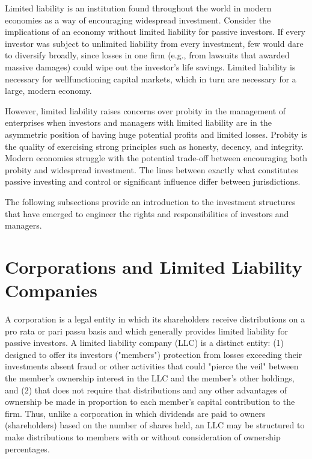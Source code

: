 \documentclass[11pt]{article}
\begin{document}
Limited liability is an institution found throughout the world in modern economies as a way of encouraging widespread investment. Consider the implications of an economy without limited liability for passive investors. If every investor was subject to unlimited liability from every investment, few would dare to diversify broadly, since losses in one firm (e.g., from lawsuits that awarded massive damages) could wipe out the investor's life savings. Limited liability is necessary for wellfunctioning capital markets, which in turn are necessary for a large, modern economy.

However, limited liability raises concerns over probity in the management of enterprises when investors and managers with limited liability are in the asymmetric position of having huge potential profits and limited losses. Probity is the quality of exercising strong principles such as honesty, decency, and integrity. Modern economies struggle with the potential trade-off between encouraging both probity and widespread investment. The lines between exactly what constitutes passive investing and control or significant influence differ between jurisdictions.

The following subsections provide an introduction to the investment structures that have emerged to engineer the rights and responsibilities of investors and managers.

\section*{Corporations and Limited Liability Companies}
A corporation is a legal entity in which its shareholders receive distributions on a pro rata or pari passu basis and which generally provides limited liability for passive investors. A limited liability company (LLC) is a distinct entity: (1) designed to offer its investors ("members") protection from losses exceeding their investments absent fraud or other activities that could "pierce the veil" between the member's ownership interest in the LLC and the member's other holdings, and (2) that does not require that distributions and any other advantages of ownership be made in proportion to each member's capital contribution to the firm. Thus, unlike a corporation in which dividends are paid to owners (shareholders) based on the number of shares held, an LLC may be structured to make distributions to members with or without consideration of ownership percentages.
\end{document}
